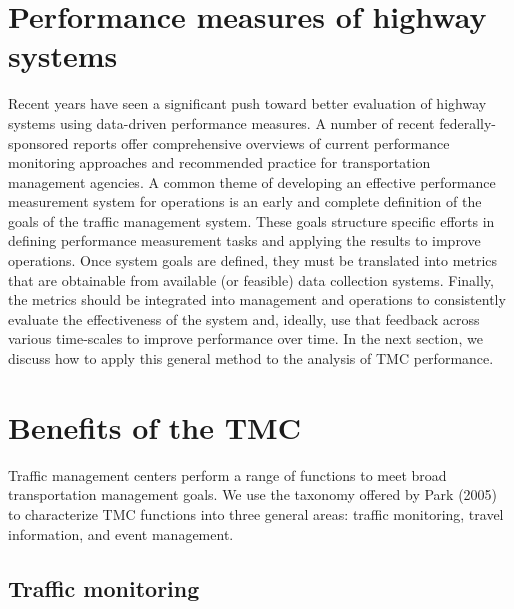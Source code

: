 \documentclass[12pt]{report}
\newcounter{time}
\begin{document}



\section{Performance measures of highway systems}
\label{sec:perf-hw-sys}

Recent years have seen a significant push toward better evaluation of
highway systems using data-driven performance measures. A number of
recent federally-sponsored reports offer comprehensive overviews of
current performance monitoring approaches and recommended practice for
transportation management agencies. A common theme of developing an
effective performance measurement system for operations is an early
and complete definition of the goals of the traffic management
system. These goals structure specific efforts in defining performance
measurement tasks and applying the results to improve operations. Once
system goals are defined, they must be translated into metrics that
are obtainable from available (or feasible) data collection systems.
Finally, the metrics should be integrated into management and
operations to consistently evaluate the effectiveness of the system
and, ideally, use that feedback across various time-scales to improve
performance over time. In the next section, we discuss how to apply
this general method to the analysis of \ac{TMC} performance.

\section{Benefits of the TMC}
\label{sec:tmc-bene}

Traffic management centers perform a range of functions to meet broad
transportation management goals. We use the taxonomy offered by Park
(2005) to characterize \ac{TMC} functions into three general areas: traffic
monitoring, travel information, and event management.

\subsection{Traffic monitoring}
\label{sec:traf-mon}
\end{document}
